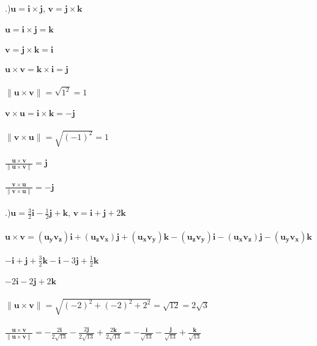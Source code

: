 \documentclass[12pt]{article}
\begin{document}
.)$\mathbf{u} = \mathbf{i} \times \mathbf{j}$, \hspace{10pt} $\mathbf{v} =  \mathbf{j} \times \mathbf{k}$\\\\
$\mathbf{u} = \mathbf{i \times j} = \mathbf{k}$\\\\
$\mathbf{v} = \mathbf{j \times k} = \mathbf{i}$\\\\
$\mathbf{u \times v} = \mathbf{k\times i} = \mathbf{j}$\\\\
$\| \mathbf{u \times v} \| = \sqrt{1^{2}} = 1$\\\\
$\mathbf{v \times u} = \mathbf{i\times k} = -\mathbf{j}$\\\\
$\| \mathbf{v \times u} \| = \sqrt{(-1)^{2}} = 1$\\\\
$\frac{\mathbf{u \times v}}{\| \mathbf{u \times v} \| } = \mathbf{j}$\\\\
$\frac{\mathbf{v \times u}}{\| \mathbf{v \times u} \| } = -\mathbf{j}$\\\\


.)$\mathbf{u} = \frac{3}{2}\mathbf{i} - \frac{1}{2}\mathbf{j} + \mathbf{k}$, \hspace{10pt} $\mathbf{v} = \mathbf{i} + \mathbf{j} + 2\mathbf{k}$\\\\

\noindent $\mathbf{u \times v } = (\mathbf{u_{y}v_{z}})\mathbf{i} + (\mathbf{u_{z}v_{x}})\mathbf{j} + (\mathbf{u_{x}v_{y}})\mathbf{k} -(\mathbf{u_{z}v_{y}})\mathbf{i} - (\mathbf{u_{x}v_{z}})\mathbf{j}-(\mathbf{u_{y}v_{x}})\mathbf{k}$\\\\
$-\mathbf{i} + \mathbf{j} + \frac{3}{2}\mathbf{k} -\mathbf{i} -3\mathbf{j}+\frac{1}{2}\mathbf{k}$\\\\
$-2\mathbf{i}-2\mathbf{j}+2\mathbf{k}$\\\\
$\| \mathbf{u \times v} \| = \sqrt{(-2)^{2} + (-2)^{2} + 2^{2}} = \sqrt{12} = 2\sqrt{3}$\\\\
$\frac{\mathbf{u \times v}}{\| \mathbf{u \times v} \|} = -\frac{2\mathbf{i}}{2\sqrt{13}} -\frac{2\mathbf{j}}{2\sqrt{13}} + \frac{2\mathbf{k}}{2\sqrt{13}} = -\frac{\mathbf{i}}{\sqrt{13}} -\frac{\mathbf{j}}{\sqrt{13}} + \frac{\mathbf{k}}{\sqrt{13}}$\\\\
\end{document}
